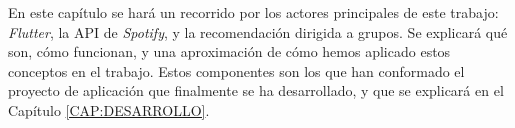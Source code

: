 En este capítulo se hará un recorrido por los actores principales de este trabajo: \textit{Flutter}, la API de
\textit{Spotify}, y la recomendación dirigida a grupos. Se explicará qué son, cómo funcionan, y una aproximación de 
cómo hemos aplicado estos conceptos en el trabajo. Estos componentes son los que han conformado el proyecto de 
aplicación que finalmente se ha desarrollado, y que se explicará en el Capítulo \ref{CAP:DESARROLLO}.